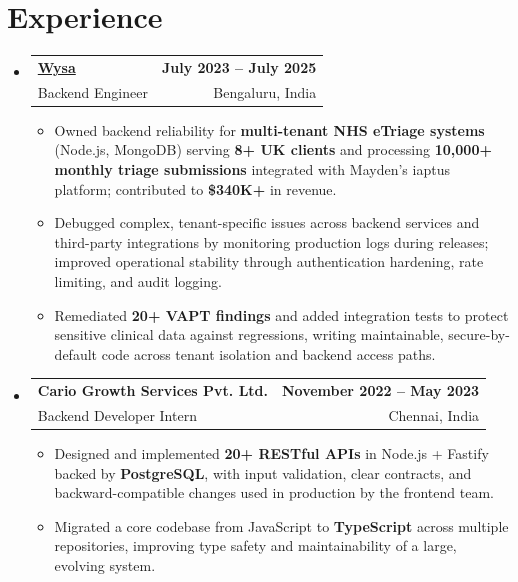 \documentclass[letterpaper,10pt]{article}
\makeatletter
\newcommand{\resumeItem}[1]{
  \item\small{#1\vspace{-1pt}}
}
\newcommand{\resumeSubheading}[4]{
  \vspace{1pt}\item
    \begin{tabular*}{0.985\textwidth}[t]{l@{\extracolsep{\fill}}r}
      \textbf{#1} & \textbf{\small #2} \\
      {\small\color{ResumeSlate} #3} & {\small\color{ResumeSlate} #4} \\
    \end{tabular*}\vspace{-6pt}
}
\newcommand{\resumeSubHeadingListStart}{\begin{itemize}[leftmargin=0.0in, label={}, itemsep=2pt, topsep=2pt]}
\newcommand{\resumeSubHeadingListEnd}{\end{itemize}}
\newcommand{\resumeItemListStart}{\begin{itemize}[leftmargin=0.18in, itemsep=2pt, topsep=1pt]}
\newcommand{\resumeItemListEnd}{\end{itemize}\vspace{-4pt}}
\makeatother
\begin{document}
\section{Experience}
\resumeSubHeadingListStart
  \resumeSubheading
    {\href{https://www.wysa.io}{Wysa}}{July 2023 -- July 2025}
    {Backend Engineer}{Bengaluru, India}
    \resumeItemListStart
      \resumeItem{Owned backend reliability for \textbf{multi-tenant NHS eTriage systems} (Node.js, MongoDB) serving \textbf{8+ UK clients} and processing \textbf{10{,}000+ monthly triage submissions} integrated with Mayden's iaptus platform; contributed to \textbf{\$340K+} in revenue.}
      \resumeItem{Debugged complex, tenant-specific issues across backend services and third-party integrations by monitoring production logs during releases; improved operational stability through authentication hardening, rate limiting, and audit logging.}
      \resumeItem{Remediated \textbf{20+ VAPT findings} and added integration tests to protect sensitive clinical data against regressions, writing maintainable, secure-by-default code across tenant isolation and backend access paths.}
    \resumeItemListEnd
  \resumeSubheading
    {Cario Growth Services Pvt. Ltd.}{November 2022 -- May 2023}
    {Backend Developer Intern}{Chennai, India}
    \resumeItemListStart
      \resumeItem{Designed and implemented \textbf{20+ RESTful APIs} in Node.js + Fastify backed by \textbf{PostgreSQL}, with input validation, clear contracts, and backward-compatible changes used in production by the frontend team.}
      \resumeItem{Migrated a core codebase from JavaScript to \textbf{TypeScript} across multiple repositories, improving type safety and maintainability of a large, evolving system.}
    \resumeItemListEnd
\resumeSubHeadingListEnd
\vspace{-4pt}
\end{document}
